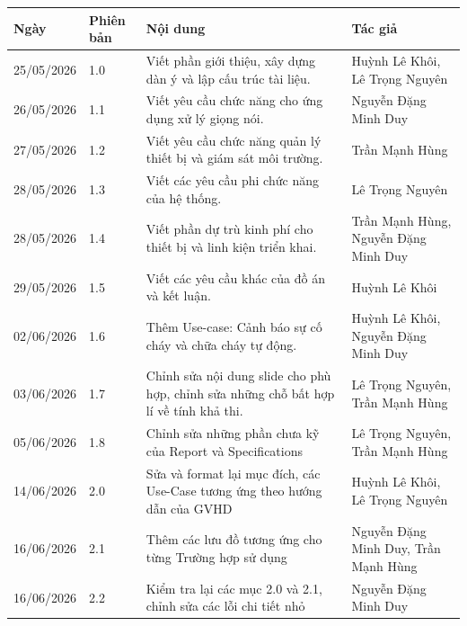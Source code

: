 \documentclass[a4paper,12pt]{article}
\begin{document}
\begin{table}[H]
\centering
\renewcommand{\arraystretch}{1.4}
\begin{tabular}{|p{3cm}|p{2cm}|p{6.5cm}|p{4cm}|}
\hline
\textbf{Ngày} & \textbf{Phiên bản} & \textbf{Nội dung} & \textbf{Tác giả} \\
\hline

25/05/2026 & 1.0 & 
Viết phần giới thiệu, xây dựng dàn ý và lập cấu trúc tài liệu. & 
Huỳnh Lê Khôi, Lê Trọng Nguyên \\
\hline

26/05/2026 & 1.1 & 
Viết yêu cầu chức năng cho ứng dụng xử lý giọng nói. & 
Nguyễn Đặng Minh Duy \\
\hline

27/05/2026 & 1.2 & 
Viết yêu cầu chức năng quản lý thiết bị và giám sát môi trường. & 
Trần Mạnh Hùng \\
\hline

28/05/2026 & 1.3 & 
Viết các yêu cầu phi chức năng của hệ thống. & 
Lê Trọng Nguyên \\
\hline

28/05/2026 & 1.4 & 
Viết phần dự trù kinh phí cho thiết bị và linh kiện triển khai. & 
Trần Mạnh Hùng, Nguyễn Đặng Minh Duy \\
\hline
29/05/2026 & 1.5 & 
Viết các yêu cầu khác của đồ án và kết luận. & 
Huỳnh Lê Khôi \\
\hline
02/06/2026 & 1.6 & 
Thêm Use-case: Cảnh báo sự cố cháy và chữa cháy tự động. & 
Huỳnh Lê Khôi, Nguyễn Đặng Minh Duy \\
\hline
03/06/2026 & 1.7 & 
Chỉnh sửa nội dung slide cho phù hợp, chỉnh sửa những chỗ bất hợp lí về tính khả thi. & 
Lê Trọng Nguyên, Trần Mạnh Hùng \\
\hline
05/06/2026 & 1.8 & 
Chỉnh sửa những phần chưa kỹ của Report và Specifications & 
Lê Trọng Nguyên, Trần Mạnh Hùng \\
\hline
14/06/2026 & 2.0 & 
Sửa và format lại mục đích, các Use-Case tương ứng theo hướng dẫn của GVHD &
Huỳnh Lê Khôi, Lê Trọng Nguyên \\
\hline
16/06/2026 & 2.1 & 
Thêm các lưu đồ tương ứng cho từng Trường hợp sử dụng &
Nguyễn Đặng Minh Duy, Trần Mạnh Hùng \\
\hline
16/06/2026 & 2.2 & 
Kiểm tra lại các mục 2.0 và 2.1, chỉnh sửa các lỗi chi tiết nhỏ &
Nguyễn Đặng Minh Duy \\
\hline


\end{tabular}
\end{table}
\newpage
\tableofcontents
\newpage
\end{document}

